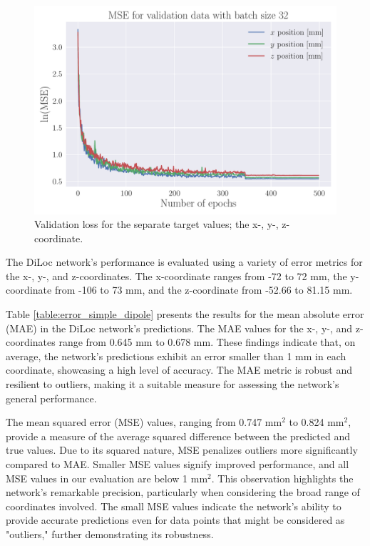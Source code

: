 \documentclass[a4paper, UKenglish, 11pt]{uiomaster}
\begin{document}
\begin{figure}[!htb]
    \centering
    \includegraphics[width=\linewidth]{figures/mse_targets_simple_32_0.001_0.35_0.5_0.0_500_(0).pdf}
    \caption{Validation loss for the separate target values; the x-, y-, z-coordinate.}
    \label{fig:single_dipole_accuracy_targets}
\end{figure}


The DiLoc network's performance is evaluated using a variety of error metrics for the x-, y-, and z-coordinates. The x-coordinate ranges from -72 to 72 mm, the y-coordinate from -106 to 73 mm, and the z-coordinate from -52.66 to 81.15 mm.

Table \ref{table:error_simple_dipole} presents the results for the mean absolute error (MAE) in the DiLoc network's predictions. The MAE values for the x-, y-, and z-coordinates range from 0.645 mm to 0.678 mm. These findings indicate that, on average, the network's predictions exhibit an error smaller than 1 mm in each coordinate, showcasing a high level of accuracy. The MAE metric is robust and resilient to outliers, making it a suitable measure for assessing the network's general performance.

The mean squared error (MSE) values, ranging from 0.747 mm$^2$ to 0.824 mm$^2$, provide a measure of the average squared difference between the predicted and true values. Due to its squared nature, MSE penalizes outliers more significantly compared to MAE. Smaller MSE values signify improved performance, and all MSE values in our evaluation are below 1 mm$^2$. This observation highlights the network's remarkable precision, particularly when considering the broad range of coordinates involved. The small MSE values indicate the network's ability to provide accurate predictions even for data points that might be considered as "outliers," further demonstrating its robustness.
\end{document}
